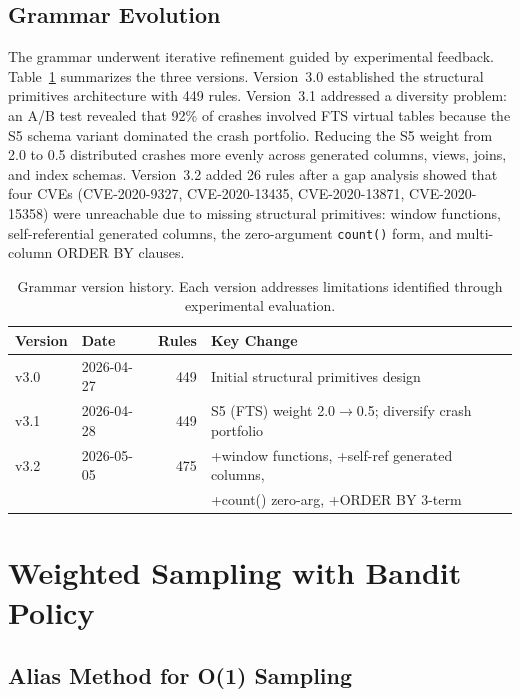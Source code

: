 \subsection{Grammar Evolution}

The grammar underwent iterative refinement guided by experimental feedback. Table~\ref{tab:grammar-evolution} summarizes the three versions. Version~3.0 established the structural primitives architecture with 449 rules. Version~3.1 addressed a diversity problem: an A/B test revealed that 92\% of crashes involved FTS virtual tables because the S5 schema variant dominated the crash portfolio. Reducing the S5 weight from 2.0 to 0.5 distributed crashes more evenly across generated columns, views, joins, and index schemas. Version~3.2 added 26 rules after a gap analysis showed that four CVEs (CVE-2020-9327, CVE-2020-13435, CVE-2020-13871, CVE-2020-15358) were unreachable due to missing structural primitives: window functions, self-referential generated columns, the zero-argument \texttt{count()} form, and multi-column ORDER BY clauses.

\begin{table}[htbp]
\caption{Grammar version history. Each version addresses limitations identified through experimental evaluation.}
\label{tab:grammar-evolution}
\centering
\begin{tabular}{llrl}
\toprule
\textbf{Version} & \textbf{Date} & \textbf{Rules} & \textbf{Key Change} \\
\midrule
v3.0 & 2026-04-27 & 449 & Initial structural primitives design \\
v3.1 & 2026-04-28 & 449 & S5 (FTS) weight 2.0$\to$0.5; diversify crash portfolio \\
v3.2 & 2026-05-05 & 475 & +window functions, +self-ref generated columns, \\
     &            &     & +count() zero-arg, +ORDER BY 3-term \\
\bottomrule
\end{tabular}
\end{table}

\section{Weighted Sampling with Bandit Policy}
\label{sec:bandit}

\subsection{Alias Method for O(1) Sampling}

